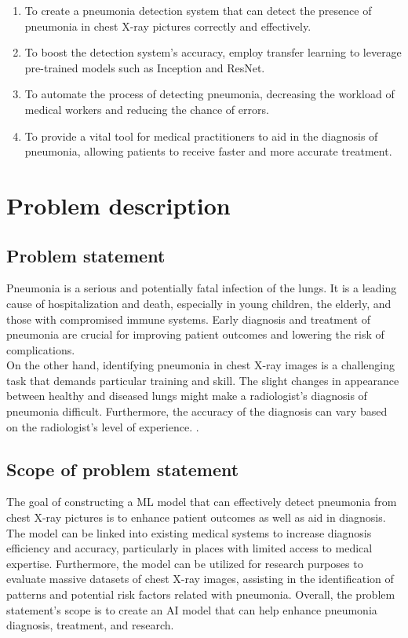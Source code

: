 \begin{enumerate}
\item To create a pneumonia detection system that can detect the presence of pneumonia in chest X-ray pictures correctly and effectively.\\
\item To boost the detection system's accuracy, employ transfer learning to leverage pre-trained models such as Inception and ResNet.\\
\item To automate the process of detecting pneumonia, decreasing the workload of medical workers and reducing the chance of errors.\\
\item To provide a vital tool for medical practitioners to aid in the diagnosis of pneumonia, allowing patients to receive faster and more accurate treatment.\\
\end{enumerate}


\section{Problem description}

\subsection{Problem statement}

Pneumonia is a serious and potentially fatal infection of the lungs. It is a leading cause of hospitalization and death, especially in young children, the elderly, and those with compromised immune systems. Early diagnosis and treatment of pneumonia are crucial for improving patient outcomes and lowering the risk of complications.\\

On the other hand, identifying pneumonia in chest X-ray images is a challenging task that demands particular training and skill. The slight changes in appearance between healthy and diseased lungs might make a radiologist's diagnosis of pneumonia difficult. Furthermore, the accuracy of the diagnosis can vary based on the radiologist's level of experience. \cite{Zhou:2018}.

\subsection{Scope of problem statement}

The goal of constructing a ML model that can effectively detect pneumonia from chest X-ray pictures is to enhance patient outcomes as well as aid in diagnosis. The model can be linked into existing medical systems to increase diagnosis efficiency and accuracy, particularly in places with limited access to medical expertise. Furthermore, the model can be utilized for research purposes to evaluate massive datasets of chest X-ray images, assisting in the identification of patterns and potential risk factors related with pneumonia. Overall, the problem statement's scope is to create an AI model that can help enhance pneumonia diagnosis, treatment, and research.\\


